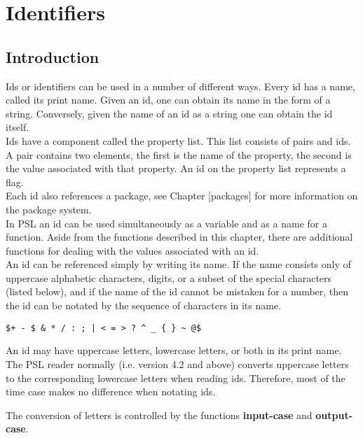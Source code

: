 \chapter{Identifiers}

\section{Introduction}

Ids  or identifiers can be used in a number of different ways.
Every id has a name, called its print name.  Given  an  id,  one
can  obtain its name in the form of a string.  Conversely, given
the name of an id as a string one can obtain the id itself.\\


\noindent
Ids have a component called the  property  list.    This  list
consists  of  pairs  and ids.  A pair contains two elements, the
first is the name of the  property,  the  second  is  the  value
associated  with  that  property.    An  id on the property list
represents a flag.\\


\noindent
Each id also references a package, see Chapter [packages]  for
more information on the package system.\\


\noindent
In PSL an id can be used simultaneously as a variable and as a
name for a function.  Aside from the functions described in this
chapter,  there  are  additional  functions for dealing with the
values associated with an id.\\


\noindent
An id can be referenced simply by writing its name. If the
name  consists  only of uppercase alphabetic characters, digits,
or a subset of the special characters (listed below), and if the
name of the id cannot be mistaken for a number,  then the id can
be notated by the sequence of characters in its name.
\begin{center}
\begin{verbatim}
$+ - $ & * / : ; | < = > ? ^ _ { } ~ @$
\end{verbatim}
\end{center}
\noindent
An id may have uppercase letters, lowercase letters, or both  in
its  print  name. The  PSL reader normally (i.e. version 4.2 and
above) converts uppercase
letters to the corresponding lowercase letters when reading ids.
Therefore, most of the time case makes  no  difference  when
notating ids. 

The conversion of letters is controlled by the functions 
{\bf input-case} and {\bf output-case}.


